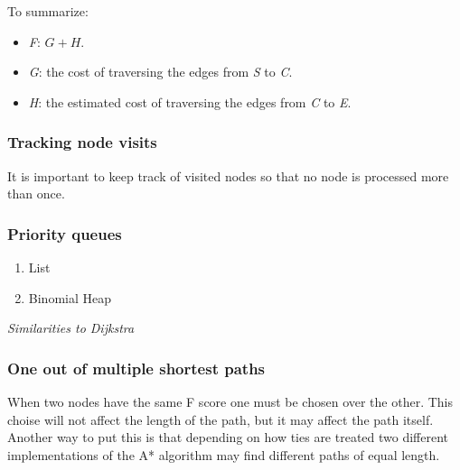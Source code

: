 \documentclass[12pt, a4paper]{article}
\begin{document}
To summarize:
\begin{itemize}
	\item \textit{F}: $ G + H $.
	\item \textit{G}: the cost of traversing the edges from \textit{S} to
	\textit{C}.
	\item \textit{H}: the estimated cost of traversing the edges from \textit{C}
	to \textit{E}.
\end{itemize}


\subsubsection{Tracking node visits}
\label{Tracking node visits}

It is important to keep track of visited nodes so that no node is processed more
than once.



\subsubsection{Priority queues}

\begin{enumerate}
\item{List}
\item{Binomial Heap}
\end{enumerate}

\textit{Similarities to Dijkstra}




\subsubsection{One out of multiple shortest paths}

When two nodes have the same F score one must be chosen over the other. This
choise will not affect the length of the path, but it may affect the path
itself. Another way to put this is that depending on how ties are treated two
different implementations of the A* algorithm may find different paths of equal
length. \cite{astar2}
\end{document}

